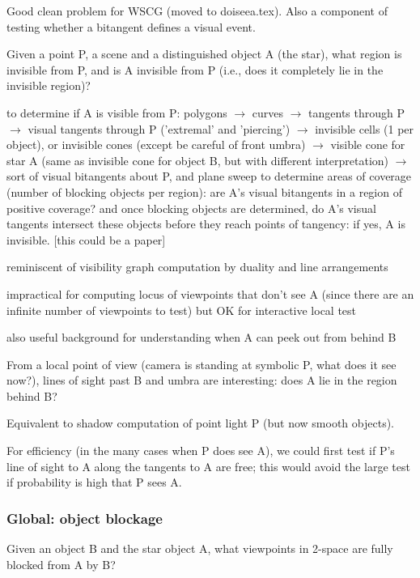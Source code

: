 \documentclass[12pt]{article}
\begin{document}
{\bf 

Good clean problem for WSCG (moved to doiseea.tex).
Also a component of testing whether a bitangent defines a visual event.

Given a point P, a scene and a distinguished object A (the star),
what region is invisible from P, and is A invisible from P (i.e., does it completely lie
in the invisible region)?

to determine if A is visible from P:
polygons $\rightarrow$
curves   $\rightarrow$
tangents through P $\rightarrow$
visual tangents through P ('extremal' and 'piercing') $\rightarrow$
invisible cells (1 per object), or invisible cones (except be careful of front umbra) 
$\rightarrow$
visible cone for star A (same as invisible cone for object B, but with different 
                         interpretation) $\rightarrow$
sort of visual bitangents about P, and plane sweep to determine areas of coverage (number
of blocking objects per region): 
   are A's visual bitangents in a region of positive coverage?
   and once blocking objects are determined, do A's visual tangents 
   intersect these objects before they reach points of tangency: if yes, A is invisible.
[this could be a paper]

reminiscent of visibility graph computation by duality and line arrangements

impractical for computing locus of viewpoints that don't see A
(since there are an infinite number of viewpoints to test)
but OK for interactive local test

also useful background for understanding when A can peek out from behind B

From a local point of view (camera is standing at symbolic P, what does it see now?),
lines of sight past B and umbra are interesting: does A lie in the region behind B?

Equivalent to shadow computation of point light P (but now smooth objects).

For efficiency (in the many cases when P does see A),
we could first test if P's line of sight to A along the tangents to A are free;
this would avoid the large test if probability is high that P sees A.
}

\clearpage

\subsubsection{Global: object blockage}

Given an object B and the star object A, 
what viewpoints in 2-space are fully blocked from A by B?
\end{document}
